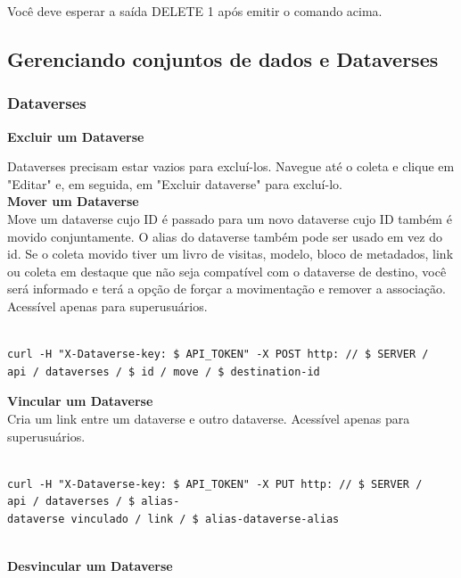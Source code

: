 \documentclass[12pt,hidelinks]{article}
\begin{document}
Você deve esperar a saída DELETE 1 após emitir o comando acima.

\subsection{Gerenciando conjuntos de dados e Dataverses}

\subsubsection{Dataverses}

\qquad\textbf{Excluir um Dataverse}

Dataverses precisam estar vazios para excluí-los. Navegue até o coleta e clique em "Editar" e, em seguida, em "Excluir dataverse" para excluí-lo.\\

\textbf{Mover um Dataverse}\\

Move um dataverse cujo ID é passado para um novo dataverse cujo ID também é movido conjuntamente. O alias do dataverse também pode ser usado em vez do id. Se o coleta movido tiver um livro de visitas, modelo, bloco de metadados, link ou coleta em destaque que não seja compatível com o dataverse de destino, você será informado e terá a opção de forçar a movimentação e remover a associação. Acessível apenas para superusuários.

\begin{verbatim}

curl -H "X-Dataverse-key: $ API_TOKEN" -X POST http: // $ SERVER / 
api / dataverses / $ id / move / $ destination-id

\end{verbatim}

\textbf{Vincular um Dataverse}\\

Cria um link entre um dataverse e outro dataverse. Acessível apenas para \\superusuários.

\begin{verbatim}

curl -H "X-Dataverse-key: $ API_TOKEN" -X PUT http: // $ SERVER /
api / dataverses / $ alias-
dataverse vinculado / link / $ alias-dataverse-alias
 
\end{verbatim}
 
\textbf{Desvincular um Dataverse}\\
\end{document}

